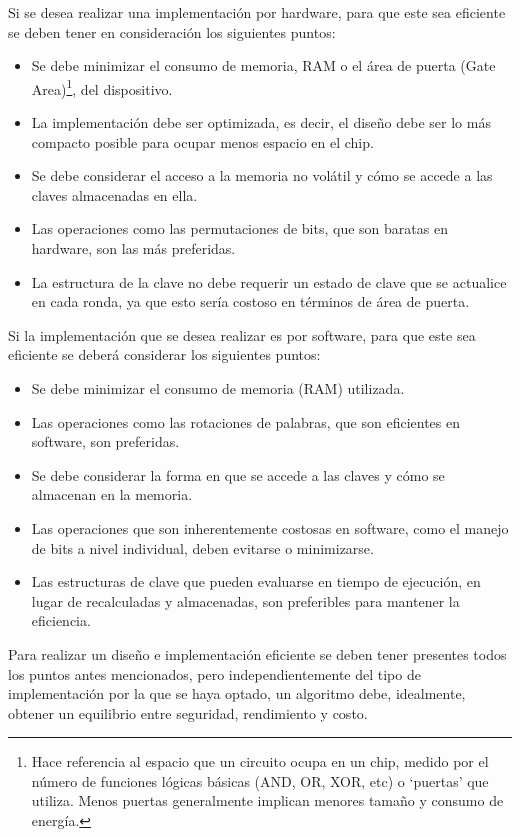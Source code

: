 \documentclass[a4paper,10pt]{article}
\begin{document}
	Si se desea realizar una implementación por hardware, para que este sea eficiente se deben tener en consideración los siguientes puntos:
	\begin{itemize}
		\item Se debe minimizar el consumo de memoria, RAM o el área de puerta (Gate Area)\footnote{Hace referencia al espacio que un circuito ocupa en un chip, medido por el número de funciones lógicas básicas (AND, OR, XOR, etc) o ‘puertas’ que utiliza. Menos puertas generalmente implican menores tamaño y consumo de energía.}, del dispositivo.
		\item La implementación debe ser optimizada, es decir, el diseño debe ser lo más compacto posible para ocupar menos espacio en el chip.
		\item Se debe considerar el acceso a la memoria no volátil y cómo se accede a las claves almacenadas en ella.
		\item Las operaciones como las permutaciones de bits, que son baratas en hardware, son las más preferidas.
		\item La estructura de la clave no debe requerir un estado de clave que se actualice en cada ronda, ya que esto sería costoso en términos de área de puerta.
	\end{itemize}
	Si la implementación que se desea realizar es por software, para que este sea eficiente se deberá considerar los siguientes puntos:
	\begin{itemize}
		\item Se debe minimizar el consumo de memoria (RAM) utilizada.
		\item Las operaciones como las rotaciones de palabras, que son eficientes en software, son preferidas.
		\item Se debe considerar la forma en que se accede a las claves y cómo se almacenan en la memoria.
		\item Las operaciones que son inherentemente costosas en software, como el manejo de bits a nivel individual, deben evitarse o minimizarse.
		\item Las estructuras de clave que pueden evaluarse en tiempo de ejecución, en lugar de recalculadas y almacenadas, son preferibles para mantener la eficiencia.
	\end{itemize}
	Para realizar un diseño e implementación eficiente se deben tener presentes todos los puntos antes mencionados, pero independientemente del tipo de implementación por la que se haya optado, un algoritmo debe, idealmente, obtener un equilibrio entre seguridad, rendimiento y costo.
\end{document}

